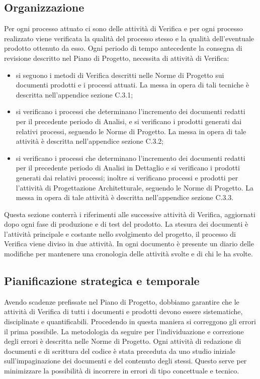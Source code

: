 \subsection{Organizzazione} %
\label{2.4}
Per ogni processo attuato ci sono delle attività di Verifica e per ogni processo realizzato viene verificata la qualità del processo stesso e la qualità dell'eventuale prodotto ottenuto da esso.
Ogni periodo di tempo antecedente la consegna di revisione descritto nel Piano di Progetto, necessita di attività di Verifica:
\begin{itemize}
\item {} si seguono i metodi di Verifica descritti nelle Norme di Progetto sui documenti prodotti e i processi attuati. La messa in opera di tali tecniche è descritta nell'appendice sezione C.3.1;
\item{} si verificano i processi che determinano l'incremento dei documenti redatti per il precedente periodo di Analisi, e si verificano i prodotti generati dai relativi processi, seguendo le Norme di Progetto. La messa in opera di tale attività è descritta nell'appendice sezione C.3.2;
\item{}  si verificano i processi che determinano l'incremento dei documenti redatti per il precedente periodo di Analisi in Dettaglio e si verificano i prodotti generati dai relativi processi; inoltre si verificano processi e prodotti per l'attività di Progettazione Architetturale, seguendo le Norme di Progetto. La messa in opera di tale attività è descritta nell'appendice sezione C.3.3.
\end{itemize}
Questa sezione conterrà i riferimenti alle successive attività di Verifica, aggiornati dopo ogni fase di produzione e di test del prodotto.
La stesura dei documenti è l'attività principale e costante nello svolgimento del progetto, il processo di Verifica viene diviso in due attività.
In ogni documento è presente un diario delle modifiche per mantenere una cronologia delle attività svolte e di chi le ha svolte.

\subsection{Pianificazione strategica e temporale} %
\label{2.5}
Avendo scadenze prefissate nel Piano di Progetto, dobbiamo garantire che le attività di Verifica di tutti i documenti e prodotti devono essere sistematiche, disciplinate e quantificabili. Procedendo in questa maniera si correggono gli errori il prima possibile.
La metodologia da seguire per l'individuazione e correzione degli errori è descritta nelle Norme di Progetto.
Ogni attività di redazione di documenti e di scrittura del codice è stata preceduta da uno studio iniziale sull'impaginazione dei documenti e del contenuto degli stessi. Questo serve per minimizzare la possibilità di incorrere in errori di tipo concettuale e tecnico.

